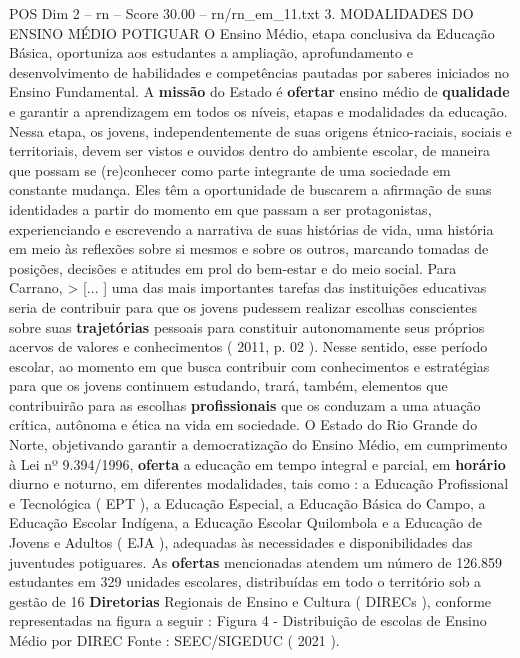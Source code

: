 \begin{textsample}{POS Dim 2 – rn – Score 30.00 – rn/rn\_em\_11.txt}  \label{ex:f2_pos_241}
3.
MODALIDADES DO ENSINO MÉDIO POTIGUAR O Ensino Médio, etapa conclusiva da Educação Básica, oportuniza aos estudantes a ampliação, aprofundamento e desenvolvimento de habilidades e competências pautadas por saberes iniciados no Ensino Fundamental.
A \textbf{missão} do Estado é \textbf{ofertar} ensino médio de \textbf{qualidade} e garantir a aprendizagem em todos os níveis, etapas e modalidades da educação.
Nessa etapa, os jovens, independentemente de suas origens étnico-raciais, sociais e territoriais, devem ser vistos e ouvidos dentro do ambiente escolar, de maneira que possam se (re)conhecer como parte integrante de uma sociedade em constante mudança.
Eles têm a oportunidade de buscarem a afirmação de suas identidades a partir do momento em que passam a ser protagonistas, experienciando e escrevendo a narrativa de suas histórias de vida, uma história em meio às reflexões sobre si mesmos e sobre os outros, marcando tomadas de posições, decisões e atitudes em prol do bem-estar e do meio social.
Para Carrano, > [... ] uma das mais importantes tarefas das instituições educativas seria de contribuir para que os jovens pudessem realizar escolhas conscientes sobre suas \textbf{trajetórias} pessoais para constituir autonomamente seus próprios acervos de valores e conhecimentos ( 2011, p. 02 ).
Nesse sentido, esse período escolar, ao momento em que busca contribuir com conhecimentos e estratégias para que os jovens continuem estudando, trará, também, elementos que contribuirão para as escolhas \textbf{profissionais} que os conduzam a uma atuação crítica, autônoma e ética na vida em sociedade.
O Estado do Rio Grande do Norte, objetivando garantir a democratização do Ensino Médio, em cumprimento à Lei nº 9.394/1996, \textbf{oferta} a educação em tempo integral e parcial, em \textbf{horário} diurno e noturno, em diferentes modalidades, tais como : a Educação Profissional e Tecnológica ( EPT ), a Educação Especial, a Educação Básica do Campo, a Educação Escolar Indígena, a Educação Escolar Quilombola e a Educação de Jovens e Adultos ( EJA ), adequadas às necessidades e disponibilidades das juventudes potiguares.
As \textbf{ofertas} mencionadas atendem um número de 126.859 estudantes em 329 unidades escolares, distribuídas em todo o território sob a gestão de 16 \textbf{Diretorias} Regionais de Ensino e Cultura ( DIRECs ), conforme representadas na figura a seguir : Figura 4 - Distribuição de escolas de Ensino Médio por DIREC Fonte : SEEC/SIGEDUC ( 2021 ).

\end{textsample}
